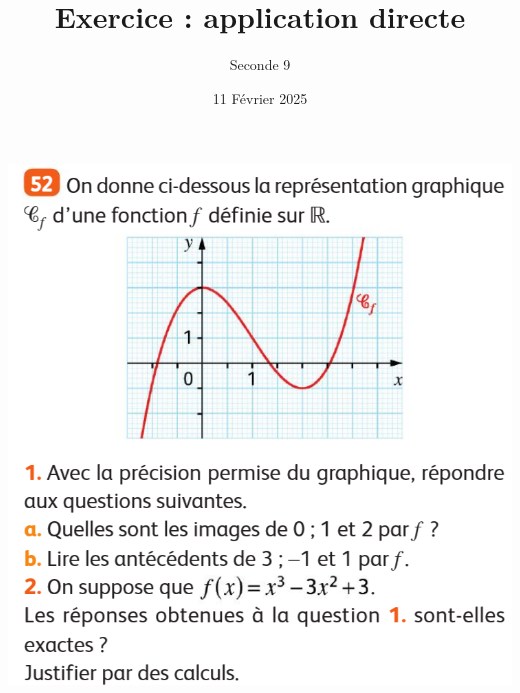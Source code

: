 \documentclass{article}
\title{Exercice : application directe}
\author{Seconde 9}
\date{11 Février 2025}
\begin{document}
\maketitle

\begin{center}
\includegraphics[width=\textwidth]{Exercice_application.png}
\end{center}
\end{document}
